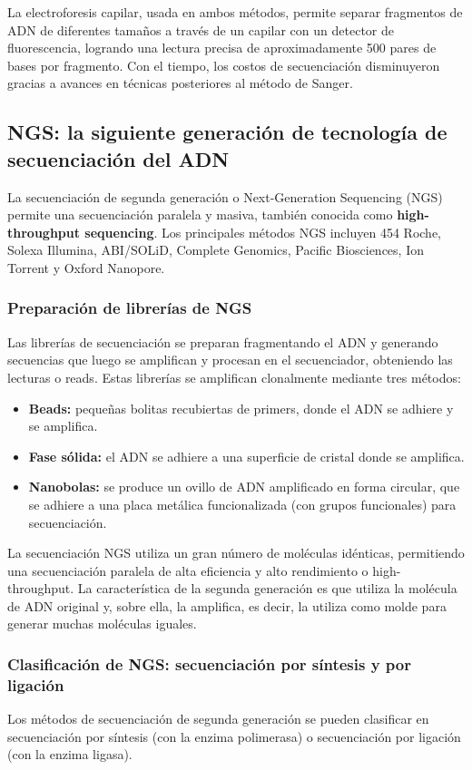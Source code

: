 La electroforesis capilar, usada en ambos métodos, permite separar fragmentos de ADN de diferentes tamaños a través de un capilar con un detector de fluorescencia, logrando una lectura precisa de aproximadamente 500 pares de bases por fragmento. Con el tiempo, los costos de secuenciación disminuyeron gracias a avances en técnicas posteriores al método de Sanger.

\subsection{NGS: la siguiente generación de tecnología de secuenciación del ADN}
La secuenciación de segunda generación o Next-Generation Sequencing (NGS) permite una secuenciación paralela y masiva, también conocida como \textbf{high-throughput sequencing}. Los principales métodos NGS incluyen 454 Roche, Solexa Illumina, ABI/SOLiD, Complete Genomics, Pacific Biosciences, Ion Torrent y Oxford Nanopore.

\subsubsection{Preparación de librerías de NGS}
Las librerías de secuenciación se preparan fragmentando el ADN y generando secuencias que luego se amplifican y procesan en el secuenciador, obteniendo las lecturas o reads. Estas librerías se amplifican clonalmente mediante tres métodos:
\begin{itemize}
\item \textbf{Beads:} pequeñas bolitas recubiertas de primers, donde el ADN se adhiere y se amplifica.
\item \textbf{Fase sólida:} el ADN se adhiere a una superficie de cristal donde se amplifica.
\item \textbf{Nanobolas:} se produce un ovillo de ADN amplificado en forma circular, que se adhiere a una placa metálica funcionalizada (con grupos funcionales) para secuenciación.
\end{itemize}

La secuenciación NGS utiliza un gran número de moléculas idénticas, permitiendo una secuenciación paralela de alta eficiencia y alto rendimiento o high-throughput. La característica de la segunda generación es que utiliza la molécula de ADN original y, sobre ella, la amplifica, es decir, la utiliza como molde para generar muchas moléculas iguales. 

\subsubsection{Clasificación de NGS: secuenciación por síntesis y por ligación}
Los métodos de secuenciación de segunda generación se pueden clasificar en secuenciación por síntesis (con la enzima polimerasa) o secuenciación por ligación (con la enzima ligasa).

